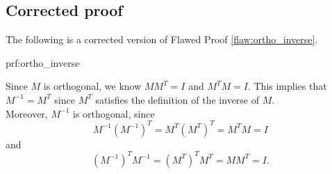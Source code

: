 \clearpage
\subsection{Corrected proof}

The following is a corrected version of Flawed Proof \ref{flaw:ortho_inverse}. %

\begin{prf}{prf:ortho_inverse} %

Since $M$ is orthogonal, we know $MM^T = I$ and $M^TM = I$. This implies that $M^{-1} = M^T$ since $M^T$ satisfies the definition of the inverse of $M$. \\

Moreover, $M^{-1}$ is orthogonal, since
$$M^{-1}(M^{-1})^T = M^T(M^T)^T = M^TM = I $$
and
$$(M^{-1})^TM^{-1} = (M^T)^TM^T = MM^T = I. $$

\end{prf} 